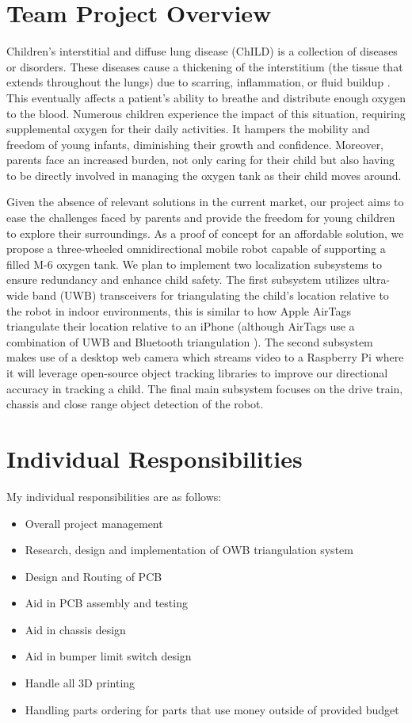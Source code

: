 \documentclass{report}
\begin{document}
    \section{Team Project Overview}
    Children's interstitial and diffuse lung disease (ChILD) is a collection of diseases or disorders. These diseases cause a thickening of the interstitium (the tissue that extends throughout the lungs) due to scarring, inflammation, or fluid buildup \cite{ChILD-2022}. This eventually affects a patient’s ability to breathe and distribute enough oxygen to the blood. Numerous children experience the impact of this situation, requiring supplemental oxygen for their daily activities. It hampers the mobility and freedom of young infants, diminishing their growth and confidence. Moreover, parents face an increased burden, not only caring for their child but also having to be directly involved in managing the oxygen tank as their child moves around.

    Given the absence of relevant solutions in the current market, our project aims to ease the challenges faced by parents and provide the freedom for young children to explore their surroundings. As a proof of concept for an affordable solution, we propose a three-wheeled omnidirectional mobile robot capable of supporting a filled M-6 oxygen tank. We plan to implement two localization subsystems to ensure redundancy and enhance child safety. The first subsystem utilizes ultra-wide band (UWB) transceivers for triangulating the child's location relative to the robot in indoor environments, this is similar to how Apple AirTags triangulate their location relative to an iPhone \cite{airtag_uwb} (although AirTags use a combination of UWB and Bluetooth triangulation \cite{airtag_ble}). The second subsystem makes use of a desktop web camera which streams video to a Raspberry Pi where it will leverage open-source object tracking libraries to improve our directional accuracy in tracking a child. The final main subsystem focuses on the drive train, chassis and close range object detection of the robot.

    \section{Individual Responsibilities}
    My individual responsibilities are as follows:

    \begin{itemize}
        \item Overall project management
        \item Research, design and implementation of OWB triangulation system
        \item Design and Routing of PCB
        \item Aid in PCB assembly and testing
        \item Aid in chassis design
        \item Aid in bumper limit switch design
        \item Handle all 3D printing
        \item Handling parts ordering for parts that use money outside of provided budget
    \end{itemize}
\end{document}
